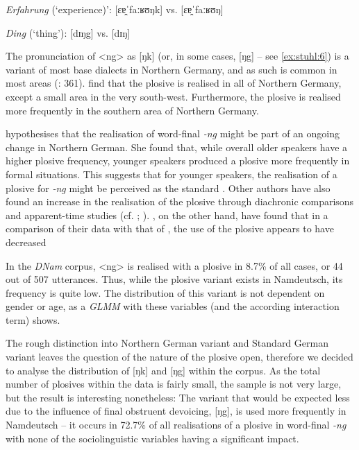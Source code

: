\documentclass[output=paper]{langsci/langscibook}
\begin{document}
 
\ea
\label{ex:stuhl:5}  
\textit{Erfahrung} (‘experience)’: {[ɛɐ̯ˈfaːʁʊŋk]} vs. {[ɛɐ̯ˈfaːʁʊŋ]}
 \z

\ea
\label{ex:stuhl:6}    
\textit{Ding} (‘thing’): {[dɪŋg]} vs. {[dɪŋ]}
 \z
 

The pronunciation of <ng> as [ŋk] (or, in some cases, [ŋg] -- see \ref{ex:stuhl:6}) is a variant of most base dialects in Northern Germany, and as such is common in most areas (\citealt{elmentaler_norddeutscher_2015}: 361). \citet[359]{elmentaler_norddeutscher_2015} find that the plosive is realised in all of Northern Germany, except a small area in the very south-west. Furthermore, the plosive is realised more frequently in the southern area of Northern Germany.

\citet[83]{becker_ruhrdeutsch_2003} hypothesises that the realisation of word-final \textit{-ng} might be part of an ongoing change in Northern German. She found that, while overall older speakers have a higher plosive frequency, younger speakers produced a plosive more frequently in formal situations. This suggests that for younger speakers, the realisation of a plosive for \textit{-ng} might be perceived as the standard \citep[83]{becker_ruhrdeutsch_2003}. Other authors have also found an increase in the realisation of the plosive through diachronic comparisons and apparent-time studies (cf. \citealt{stellmacher_studien_1977}; \citealt{lameli_standard_2004}). \citet[362]{elmentaler_norddeutscher_2015}, on the other hand, have found that in a comparison of their data with that of \citet{pfeffer_grunddeutsch_1975}, the use of the plosive appears to have decreased

In the \textit{DNam} corpus, <ng> is realised with a plosive in 8.7\% of all cases, or 44 out of 507 utterances. Thus, while the plosive variant exists in Namdeutsch, its frequency is quite low. The distribution of this variant is not dependent on gender or age, as a \textit{GLMM} with these variables (and the according interaction term) shows. 

The rough distinction into Northern German variant and Standard German variant leaves the question of the nature of the plosive open, therefore we decided to analyse the distribution of [ŋk] and [ŋg] within the corpus. As the total number of plosives within the data is fairly small, the sample is not very large, but the result is interesting nonetheless: The variant that would be expected less due to the influence of final obstruent devoicing, [ŋg], is used more frequently in Namdeutsch – it occurs in 72.7\% of all realisations of a plosive in word-final \textit{-ng} with none of the sociolinguistic variables having a significant impact.
\end{document}
